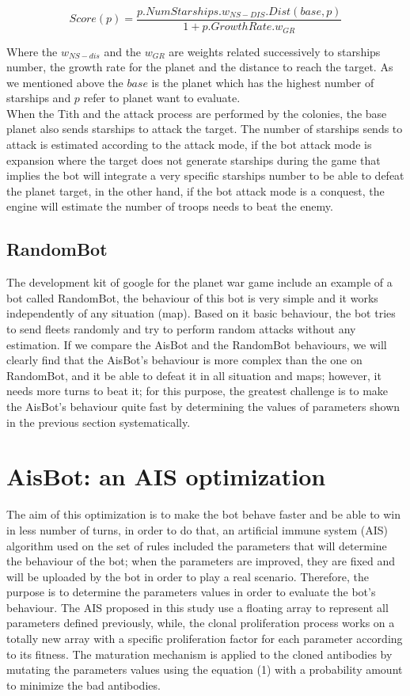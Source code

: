 \documentclass[conference]{IEEEtran}
\begin{document}
\begin{equation}
Score(p) = \frac{p.NumStarships.w_{NS-DIS}.Dist(base,p)}{1+p.GrowthRate.w_{GR}}
\end{equation}

Where the $w_{NS-dis}$ and the $w_{GR}$ are weights related successively to starships number, the growth rate for the planet and the distance to reach the target. As we mentioned above the $base$ is the planet which has the highest number of starships and $p$ refer to planet want to evaluate. \\ 

When the Tith and the attack process are performed by the colonies, the base planet also sends starships to attack the target. The number of starships sends to attack is estimated according to the attack mode, if the bot attack mode is expansion where the target does not generate starships during the game that implies the bot will integrate a very specific starships number to be able to defeat the planet target, in the other hand, if the bot attack mode is a conquest, the engine will estimate the number of troops needs to beat the enemy.




\subsection{RandomBot}
The development kit of google for the planet war game include an example of a bot called RandomBot, the behaviour of this bot is very simple and it works independently of any situation (map). Based on it basic behaviour, the bot tries to send fleets randomly and try to perform random attacks without any estimation. If we compare the AisBot and the RandomBot behaviours, we will clearly find that the AisBot's behaviour is more complex than the one on RandomBot, and it be able to defeat it in all situation and maps; however, it needs more turns to beat it; for this purpose, the greatest challenge is to make the AisBot's behaviour quite fast by determining the values of parameters shown in the previous section systematically.


\section{AisBot: an AIS optimization}
The aim of this optimization is to make the bot behave faster and be able to win in less number of turns, in order to do that, an artificial immune system (AIS) algorithm used on the set of rules included the parameters that will determine the behaviour of the bot; when the parameters are improved, they are fixed and will be uploaded by the bot in order to play a real scenario. 
Therefore, the purpose is to determine the parameters values in order to evaluate the bot's behaviour. The AIS proposed in this study use a floating array to represent all parameters defined previously, while, the clonal proliferation process works on a totally new array with a specific proliferation factor for each parameter according to its fitness. The maturation mechanism is applied to the cloned antibodies by mutating the parameters values using the equation (1) with a probability amount to minimize the bad antibodies. \\
\end{document}
